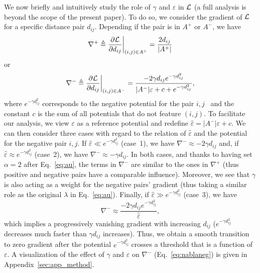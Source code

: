 We now briefly and intuitively study the role of $\gamma$ and $\varepsilon$ in $\mathcal{L}$ (a full analysis is beyond the scope of the present paper). To do so, we consider the gradient of $\mathcal{L}$ for a specific distance pair $d_{ij}$. Depending if the pair is in $A^+$ or $A^-$, we have
\begin{equation*}
\nabla^+ \triangleq \frac{\partial \mathcal{L}}{\partial d_{ij}} \bigg|_{(i,j)\in A^+} = \frac{2 d_{ij}}{|A^+|}
\end{equation*}
or
\begin{equation}
\nabla^- \triangleq \frac{\partial \mathcal{L}}{\partial d_{ij}} \bigg|_{(i,j)\in A^-} = \frac{-2\gamma d_{ij} e^{-\gamma d^2_{ij}} }{|A^-|\varepsilon + c + e^{-\gamma d^2_{ij}} } ,
\label{eq:nablaneg}
\end{equation}
where $e^{-\gamma d_{ij}^2}$ corresponds to the negative potential for the pair $i,j$~\cite{wang_understanding_2020} and the constant $c$ is the sum of all potentials that do not feature $(i,j)$. To facilitate our analysis, we view $\varepsilon$ as a reference potential and redefine $\hat{\varepsilon} = |A^-|\varepsilon + c$. We can then consider three cases with regard to the relation of $\hat{\varepsilon}$ and the potential for the negative pair $i,j$. If $\hat{\varepsilon} \ll e^{-\gamma d^2_{ij}}$ (case~1), we have $\nabla^- \approx -2\gamma d_{ij}$ and, if $\hat{\varepsilon} \approx e^{-\gamma d^2_{ij}}$ (case~2), we have $\nabla^- \approx -\gamma d_{ij}$. In both cases, and thanks to having set $\alpha=2$ after Eq.~\ref{eq:au}, the terms in $\nabla^-$ are similar to the ones in $\nabla^+$ (thus positive and negative pairs have a comparable influence). Moreover, we see that $\gamma$ is also acting as a weight for the negative pairs' gradient (thus taking a similar role as the original $\lambda$ in Eq.~\ref{eq:au}). 
Finally, if $\hat{\varepsilon} \gg e^{-\gamma d^2_{ij}}$ (case~3), we have
\begin{equation*}
\nabla^- \approx \frac{-2\gamma d_{ij} e^{-\gamma d^2_{ij}} }{\hat{\varepsilon}} ,
\end{equation*}
which implies a progressively vanishing gradient with increasing $d_{ij}$ ($e^{-\gamma d^2_{ij}}$ decreases much faster than $\gamma d_{ij}$ increases). %
Thus, we obtain a smooth transition to zero gradient after the potential $e^{-\gamma d^2_{ij}}$ crosses a threshold that is a function of $\varepsilon$. %
A visualization of the effect of $\gamma$ and $\varepsilon$ on $\nabla^-$ (Eq.~\ref{eq:nablaneg}) is given in Appendix~\ref{sec:app_method}.


